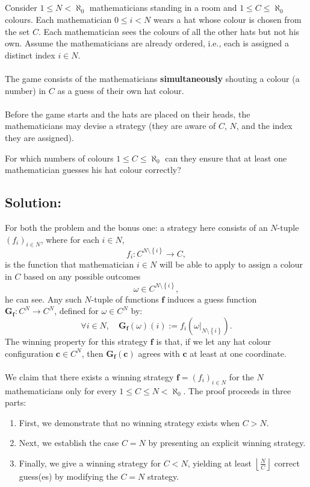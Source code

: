\documentclass[11pt, a4paper, oneside]{article}
\newcommand{\solution}[1][]{\subsection*{#1}\hfill \par}
\theoremstyle{remark}
\theoremstyle{lemma}
\begin{document}
\newpage
\subsection{}
Consider \(\left.1 \leq N < \aleph_0\right.\) mathematicians standing in a room and \(\left.1 \leq C \leq \aleph_0\right.\) colours. Each mathematician \(\left.0 \leq i < N\right.\) wears a hat whose colour is chosen from the set \(C\). Each mathematician sees the colours of all the other hats but not his own. Assume the mathematicians are already ordered, i.e., each is assigned a distinct index \(i \in N\).
\\\\
The game consists of the mathematicians \textbf{simultaneously} shouting a colour (a number) in \(C\) as a guess of their own hat colour.
\\\\
Before the game starts and the hats are placed on their heads, the mathematicians may devise a strategy (they are aware of \(C\), \(N\), and the index they are assigned).

For which numbers of colours \(\left.1 \leq C \leq \aleph_0\right.\) can they ensure that at least one mathematician guesses his hat colour correctly?


\solution[Solution:]
For both the problem and the bonus one: a strategy here consists of an \(N\)-tuple \(\left(f_i\right)_{i \in N}\), where for each \(i \in N\),
\[
f_i \colon C^{N \setminus \left\{i\right\}} \rightarrow C,
\]
is the function that mathematician \(i \in N\) will be able to apply to assign a colour in \(C\) based on any possible outcomes
\[
\omega \in C^{N \setminus \left\{i\right\}},
\]
he can see. Any such \(N\)-tuple of functions \(\mathbf{f}\) induces a guess function \(\mathbf{G}_{\mathbf{f}} \colon C^N \rightarrow C^N\), defined for \(\omega \in C^N\) by:
\[
\forall i \in N, \quad \mathbf{G}_{\mathbf{f}}(\omega)(i) := f_i\left(\left.\omega\right|_{N \setminus \left\{i\right\}}\right).
\]
The winning property for this strategy \(\mathbf{f}\) is that, if we let any hat colour configuration \(\mathbf{c} \in C^N\), then \(\mathbf{G}_{\mathbf{f}}(\mathbf{c})\) agrees with \(\mathbf{c}\) at least at one coordinate.
\\\\
We claim that there exists a winning strategy \(\mathbf{f} = \left(f_i\right)_{i \in N}\) for the \(N\) mathematicians only for every \(\left.1 \leq C \leq N < \aleph_0\right.\). The proof proceeds in three parts:
\begin{enumerate}
    \item First, we demonstrate that no winning strategy exists when \(C > N\).
    \item Next, we establish the case \(C = N\) by presenting an explicit winning strategy.
    \item Finally, we give a winning strategy for \(C < N\), yielding at least \(\left\lfloor \frac{N}{C} \right\rfloor\) correct guess(es) by modifying the \(C = N\) strategy.
\end{enumerate}
\end{document}
